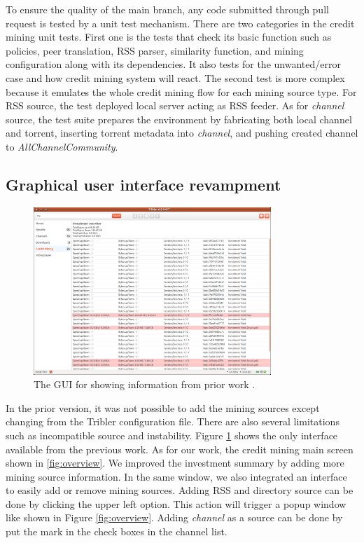To ensure the quality of the main branch, any code submitted through pull request is tested by a unit test mechanism. There are two categories in the credit mining unit tests. First one is the tests that check its basic function such as policies, peer translation, RSS parser, similarity function, and mining configuration along with its dependencies. It also tests for the unwanted/error case and how credit mining system will react. The second test is more complex because it emulates the whole credit mining flow for each mining source type. For RSS source, the test deployed local server acting as RSS feeder. As for \textit{channel} source, the test suite prepares the environment by fabricating both local channel and torrent, inserting torrent metadata into \textit{channel}, and pushing created channel to \textit{AllChannelCommunity}. 

\subsection{Graphical user interface revampment}
\begin{figure}[h]
	\centering
	\includegraphics[width=0.8\textwidth]{pics/old_cm.png}
	\caption{The GUI for showing information from prior work \cite{2015:creditmining:capota}.}
	\label{fig:oldcm}
\end{figure}
In the prior version, it was not possible to add the mining sources except changing from the Tribler configuration file. There are also several limitations such as incompatible source and instability. Figure \ref{fig:oldcm} shows the only interface available from the previous work. As for our work, the credit mining main screen shown in \ref{fig:overview}. We improved the investment summary by adding more mining source information. In the same window, we also integrated an interface to easily add or remove mining sources. Adding RSS and directory source can be done by clicking the upper left option. This action will trigger a popup window like shown in Figure \ref{fig:overview}. Adding \textit{channel} as a source can be done by put the mark in the check boxes in the channel list.

